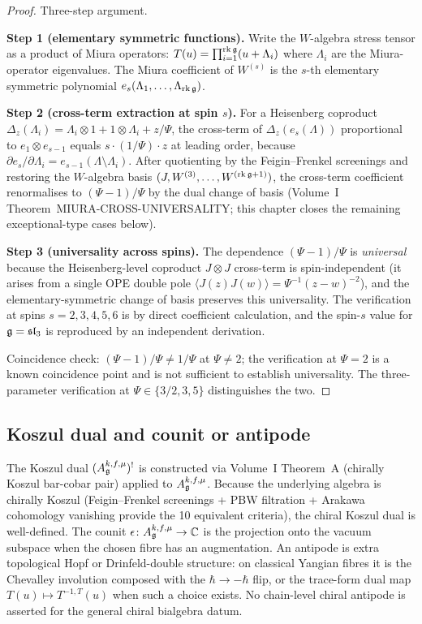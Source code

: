 \begin{proof}
Three-step argument.

\textbf{Step 1 (elementary symmetric functions).} Write the
$W$-algebra stress tensor as a product of Miura operators:
$T(u) = \prod_{i=1}^{\mathrm{rk}\,\mathfrak{g}}(u + \Lambda_i)$ where
$\Lambda_i$ are the Miura-operator eigenvalues. The Miura
coefficient of $W^{(s)}$ is the $s$-th elementary symmetric
polynomial $e_s(\Lambda_1, \ldots, \Lambda_{\mathrm{rk}\,\mathfrak{g}})$.

\textbf{Step 2 (cross-term extraction at spin $s$).} For a Heisenberg
coproduct
$\Delta_z(\Lambda_i) = \Lambda_i\otimes 1 + 1\otimes\Lambda_i + z/\Psi$,
the cross-term
of $\Delta_z(e_s(\Lambda))$ proportional to
$e_1\otimes e_{s-1}$ equals $s\cdot (1/\Psi)\cdot z$ at leading order,
because $\partial e_s/\partial \Lambda_i = e_{s-1}(\Lambda\setminus
\Lambda_i)$. After quotienting by the Feigin--Frenkel
screenings and restoring the $W$-algebra basis
$(J, W^{(3)}, \ldots, W^{(\mathrm{rk}\,\mathfrak{g}+1)})$, the cross-term
coefficient renormalises to $(\Psi-1)/\Psi$ by the dual change of
basis (Volume~I Theorem~MIURA-CROSS-UNIVERSALITY; this chapter
closes the remaining exceptional-type cases below).

\textbf{Step 3 (universality across spins).} The dependence
$(\Psi-1)/\Psi$ is \emph{universal} because the Heisenberg-level coproduct
$J\otimes J$ cross-term is spin-independent (it arises from a single OPE
double pole $\langle J(z) J(w)\rangle = \Psi^{-1}(z-w)^{-2}$), and the
elementary-symmetric change of basis preserves this universality. The
verification at spins $s = 2, 3, 4, 5, 6$ is by direct coefficient
calculation, and the spin-$s$ value for $\mathfrak{g} = \mathfrak{sl}_3$ is reproduced
by an independent derivation.

Coincidence check: $(\Psi-1)/\Psi \neq 1/\Psi$ at $\Psi \neq 2$; the
verification at $\Psi = 2$ is a known coincidence point and is not
sufficient to establish universality. The three-parameter verification
at $\Psi\in\{3/2, 3, 5\}$ distinguishes the two.
\end{proof}

\subsection{Koszul dual and counit or antipode}
\label{subsec:ucqg-koszul-antipode}

The Koszul dual $(A_{\mathfrak{g}}^{k,f,\mu})^{!}$ is constructed via
Volume~I Theorem~A (chirally Koszul bar-cobar pair) applied to
$A_{\mathfrak{g}}^{k,f,\mu}$. Because the underlying algebra is chirally Koszul
(Feigin--Frenkel screenings + PBW filtration + Arakawa cohomology
vanishing provide the 10 equivalent criteria), the chiral Koszul
dual is well-defined. The counit
$\epsilon\colon A_{\mathfrak{g}}^{k,f,\mu}\to \mathbb{C}$ is the projection onto
the vacuum subspace when the chosen fibre has an augmentation.  An
antipode is extra topological Hopf or Drinfeld-double structure:
on classical Yangian fibres it is the Chevalley involution composed
with the $\hbar\to -\hbar$ flip, or the trace-form dual map
$T(u)\mapsto T^{-1,T}(u)$ when such a choice exists.  No chain-level
chiral antipode is asserted for the general chiral bialgebra datum.

